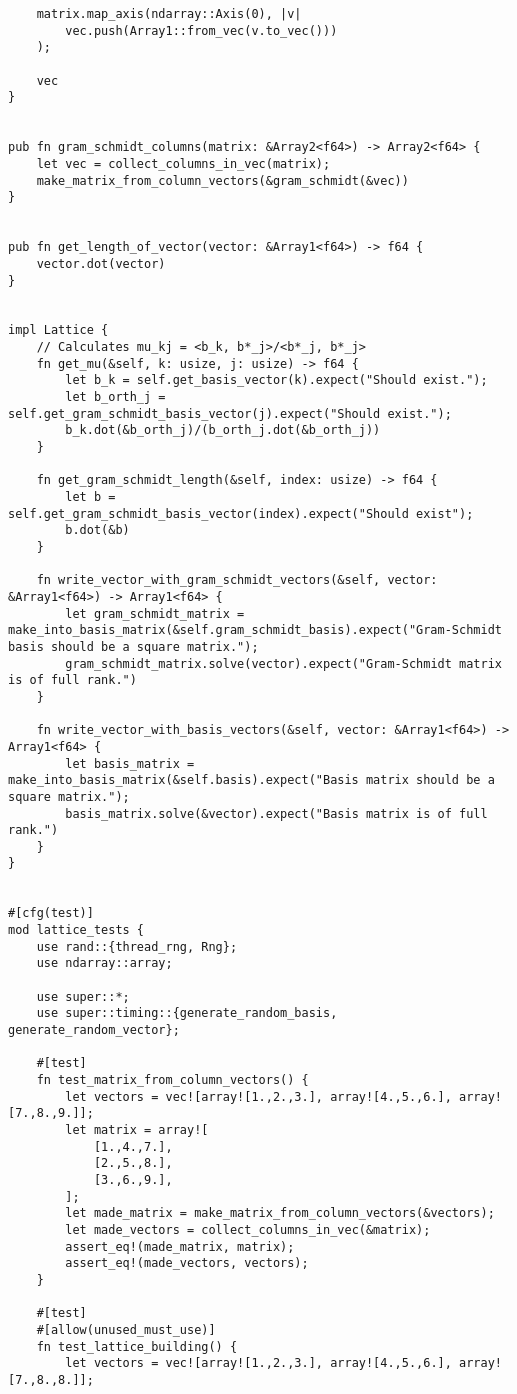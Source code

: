 \begin{verbatim}
    matrix.map_axis(ndarray::Axis(0), |v| 
        vec.push(Array1::from_vec(v.to_vec()))
    );

    vec
}


pub fn gram_schmidt_columns(matrix: &Array2<f64>) -> Array2<f64> {
    let vec = collect_columns_in_vec(matrix);
    make_matrix_from_column_vectors(&gram_schmidt(&vec))
}


pub fn get_length_of_vector(vector: &Array1<f64>) -> f64 {
    vector.dot(vector)
}


impl Lattice {
    // Calculates mu_kj = <b_k, b*_j>/<b*_j, b*_j>
    fn get_mu(&self, k: usize, j: usize) -> f64 {
        let b_k = self.get_basis_vector(k).expect("Should exist.");
        let b_orth_j = self.get_gram_schmidt_basis_vector(j).expect("Should exist.");
        b_k.dot(&b_orth_j)/(b_orth_j.dot(&b_orth_j))
    }

    fn get_gram_schmidt_length(&self, index: usize) -> f64 {
        let b = self.get_gram_schmidt_basis_vector(index).expect("Should exist");
        b.dot(&b)
    }

    fn write_vector_with_gram_schmidt_vectors(&self, vector: &Array1<f64>) -> Array1<f64> {
        let gram_schmidt_matrix = make_into_basis_matrix(&self.gram_schmidt_basis).expect("Gram-Schmidt basis should be a square matrix.");
        gram_schmidt_matrix.solve(vector).expect("Gram-Schmidt matrix is of full rank.")
    }

    fn write_vector_with_basis_vectors(&self, vector: &Array1<f64>) -> Array1<f64> {
        let basis_matrix = make_into_basis_matrix(&self.basis).expect("Basis matrix should be a square matrix.");
        basis_matrix.solve(&vector).expect("Basis matrix is of full rank.")
    }
}


#[cfg(test)]
mod lattice_tests {
    use rand::{thread_rng, Rng};
    use ndarray::array;

    use super::*;
    use super::timing::{generate_random_basis, generate_random_vector};

    #[test]
    fn test_matrix_from_column_vectors() {
        let vectors = vec![array![1.,2.,3.], array![4.,5.,6.], array![7.,8.,9.]];
        let matrix = array![
            [1.,4.,7.],
            [2.,5.,8.],
            [3.,6.,9.],
        ];
        let made_matrix = make_matrix_from_column_vectors(&vectors);
        let made_vectors = collect_columns_in_vec(&matrix);
        assert_eq!(made_matrix, matrix);
        assert_eq!(made_vectors, vectors);
    }

    #[test]
    #[allow(unused_must_use)]
    fn test_lattice_building() {
        let vectors = vec![array![1.,2.,3.], array![4.,5.,6.], array![7.,8.,8.]];


\end{verbatim}
